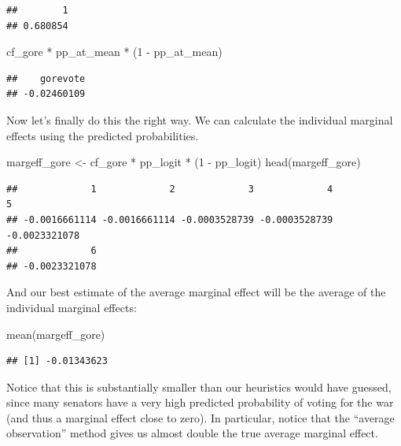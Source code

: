 \documentclass[
  12pt,
  oneside,openany]{book}
\newenvironment{Shaded}{\begin{snugshade}}{\end{snugshade}}
\newcommand{\DecValTok}[1]{\textcolor[rgb]{0.00,0.00,0.81}{#1}}
\newcommand{\FunctionTok}[1]{\textcolor[rgb]{0.00,0.00,0.00}{#1}}
\newcommand{\NormalTok}[1]{#1}
\newcommand{\OtherTok}[1]{\textcolor[rgb]{0.56,0.35,0.01}{#1}}
\newcommand{\SpecialCharTok}[1]{\textcolor[rgb]{0.00,0.00,0.00}{#1}}
\begin{document}
\begin{verbatim}
##        1 
## 0.680854
\end{verbatim}

\begin{Shaded}
\begin{Highlighting}[]
\NormalTok{cf\_gore }\SpecialCharTok{*}\NormalTok{ pp\_at\_mean }\SpecialCharTok{*}\NormalTok{ (}\DecValTok{1} \SpecialCharTok{{-}}\NormalTok{ pp\_at\_mean)}
\end{Highlighting}
\end{Shaded}

\begin{verbatim}
##    gorevote 
## -0.02460109
\end{verbatim}

Now let's finally do this the right way.
We can calculate the individual marginal effects using the predicted probabilities.

\begin{Shaded}
\begin{Highlighting}[]
\NormalTok{margeff\_gore }\OtherTok{\textless{}{-}}\NormalTok{ cf\_gore }\SpecialCharTok{*}\NormalTok{ pp\_logit }\SpecialCharTok{*}\NormalTok{ (}\DecValTok{1} \SpecialCharTok{{-}}\NormalTok{ pp\_logit)}
\FunctionTok{head}\NormalTok{(margeff\_gore)}
\end{Highlighting}
\end{Shaded}

\begin{verbatim}
##             1             2             3             4             5 
## -0.0016661114 -0.0016661114 -0.0003528739 -0.0003528739 -0.0023321078 
##             6 
## -0.0023321078
\end{verbatim}

And our best estimate of the average marginal effect will be the average of the individual marginal effects:

\begin{Shaded}
\begin{Highlighting}[]
\FunctionTok{mean}\NormalTok{(margeff\_gore)}
\end{Highlighting}
\end{Shaded}

\begin{verbatim}
## [1] -0.01343623
\end{verbatim}

Notice that this is substantially smaller than our heuristics would have guessed, since many senators have a very high predicted probability of voting for the war (and thus a marginal effect close to zero).
In particular, notice that the ``average observation'' method gives us almost double the true average marginal effect.
\end{document}
